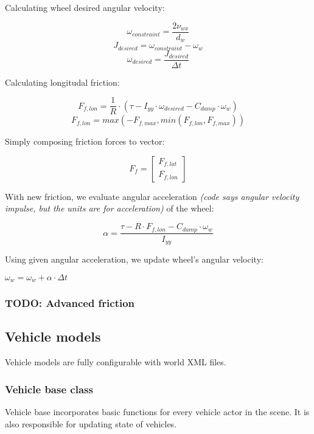 \documentclass[a4paper,11pt]{article}
\begin{document}
Calculating wheel desired angular velocity:

\begin{center}
\[
\omega_{constraint} = \frac{2\nu_{wx}}{d_w}
\]
\[
J_{desired} = \omega_{constraint} - \omega_w
\]
\[
\omega_{desired} = \frac{J_{desired}}{\Delta t}
\]
\end{center}


Calculating longitudal friction:
\begin{center}
\[
F_{f,lon} = \frac{1}{R} \cdot (\tau - I_{yy}\cdot \omega_{desired} - C_{damp} \cdot \omega_w)
\]
\[
F_{f,lon} = max(-F_{f,max}, min(F_{f,lon}, F_{f,max}))
\]
\end{center}

Simply composing friction forces to vector:
\begin{center}
\[
F_f = 
\begin{bmatrix}
F_{f,lat} \\
F_{f,lon}
\end{bmatrix}
\]
\end{center}

With new friction, we evaluate angular acceleration \textit{(code says angular velocity impulse, but the units are for acceleration)}  of the wheel:
\begin{center}
\[
\alpha = \frac{ \tau - R \cdot F_{f,lon} - C_{damp} \cdot \omega_w}{I_{yy}}
\]
\end{center}

Using given angular acceleration, we update wheel's angular velocity:
\begin{center}
$
\omega_w = \omega_w + \alpha \cdot \Delta t
$
\end{center}

\newpage
\subsubsection{TODO: Advanced friction}
\newpage

\subsection{Vehicle models}

Vehicle models are fully configurable with world XML files. 

\subsubsection{Vehicle base class}

Vehicle base incorporates basic functions for every vehicle actor in the scene. It is also responsible for updating state of vehicles.
\end{document}
